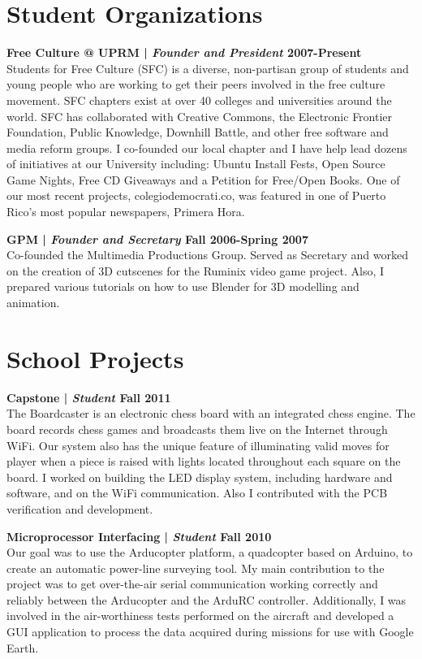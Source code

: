 \documentclass[margin,line]{res}
\begin{document}
\begin{resume}
\section{\sc Student Organizations}

{\bf Free Culture @ UPRM | {\em Founder and President} \hfill {\bf 2007-Present \\} }
\vspace{-.01cm}
Students for Free Culture (SFC) is a diverse, non-partisan group of students and young people who are working to get their peers involved in the free culture movement. SFC chapters exist at over 40 colleges and universities around the world. SFC has collaborated with Creative Commons, the Electronic Frontier Foundation, Public Knowledge, Downhill Battle, and other free software and media reform groups. I co-founded our local chapter and I have help lead dozens of initiatives at our University including: Ubuntu Install Fests, Open Source Game Nights, Free CD Giveaways and a Petition for Free/Open Books. One of our most recent projects, colegiodemocrati.co, was featured in one of Puerto Rico's most popular newspapers, Primera Hora.

{\bf GPM | {\em Founder and Secretary} \hfill {\bf Fall 2006-Spring 2007 \\} }
\vspace{-.01cm}
Co-founded the Multimedia Productions Group. Served as Secretary and worked on the creation of 3D cutscenes for the Ruminix video game project. Also, I prepared various tutorials on how to use Blender for 3D modelling and animation.

\section{\sc School Projects}

{\bf Capstone | {\em Student} \hfill {\bf Fall 2011 \\} }
\vspace{-.01cm}
The Boardcaster is an electronic chess board with an integrated chess engine. The board records chess games and broadcasts them live on the Internet through WiFi. Our system also has the unique feature of illuminating valid moves for player when a piece is raised with lights located throughout each square on the board. I worked on building the LED display system, including hardware and software, and on the WiFi communication. Also I contributed with the PCB verification and development.

{\bf Microprocessor Interfacing | {\em Student} \hfill {\bf Fall 2010 \\} }
\vspace{-.01cm}
Our goal was to use the Arducopter platform, a quadcopter based on Arduino, to create an automatic power-line surveying tool. My main contribution to the project was to get over-the-air serial communication working correctly and reliably between the Arducopter and the ArduRC controller. Additionally, I was involved in the air-worthiness tests performed on the aircraft and developed a GUI application to process the data acquired during missions for use with Google Earth.


\end{resume}
\end{document}
